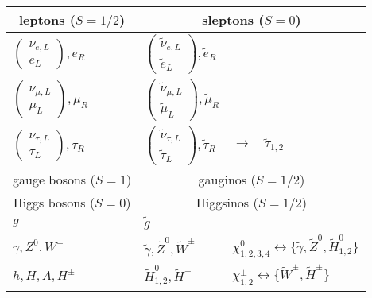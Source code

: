 \begin{table}[!htb]
\begin{center}
\begin{tabular}{lll}
\midrule 
        \multicolumn{1}{c}{leptons ($S=1/2$)} & \multicolumn{2}{c}{sleptons ($S=0$)} \\
        \midrule
        $\begin{pmatrix} \nu_{e,L}\\e_{L} \end{pmatrix}, e_{R}$ &
        $\begin{pmatrix} \tilde{\nu}_{e,L}\\\tilde{e}_{L} \end{pmatrix}, \tilde{e}_{R}$ & \\
        $\begin{pmatrix} \nu_{\mu,L}\\\mu_{L} \end{pmatrix}, \mu_{R}$ &
        $\begin{pmatrix} \tilde{\nu}_{\mu,L}\\\tilde{\mu}_{L} \end{pmatrix}, \tilde{\mu}_{R}$ & \\
        $\begin{pmatrix} \nu_{\tau,L}\\\tau_{L} \end{pmatrix}, \tau_{R}$ &
        $\begin{pmatrix} \tilde{\nu}_{\tau,L}\\\tilde{\tau}_{L} \end{pmatrix}, \tilde{\tau}_{R}$ & 
        $\rightarrow\quad \tilde{\tau}_{1,2}$\\
\midrule
        \multicolumn{1}{c}{gauge bosons ($S=1$)} & \multicolumn{2}{c}{gauginos ($S=1/2$)} \\
        \multicolumn{1}{c}{Higgs bosons ($S=0$)} & \multicolumn{2}{c}{Higgsinos ($S=1/2$)} \\
        \midrule
        $g$ &
        $\tilde{g}$ & \\
        $\gamma,Z^{0},W^{\pm}$ &
        $\tilde{\gamma},\tilde{Z}^{0},\tilde{W}^{\pm}$ & 
        $\chi^{0}_{1,2,3,4}\leftrightarrow\{\tilde{\gamma},\tilde{Z}^{0},\tilde{H}^{0}_{1,2}\}$ \\
        $h,H,A,H^{\pm}$ & 
        $\tilde{H}^{0}_{1,2},\tilde{H}^{\pm}$ & 
        $\chi^{\pm}_{1,2}\leftrightarrow\{\tilde{W}^{\pm},\tilde{H}^{\pm}\}$ \\
        \bottomrule
        \end{tabular}
        \end{center}
\end{table}


